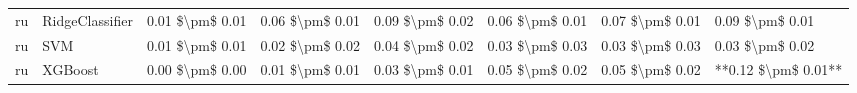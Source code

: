 \begin{tabular}{llllllll}
      ru &                 RidgeClassifier & 0.01 \$\textbackslash pm\$ 0.01 &           0.06 \$\textbackslash pm\$ 0.01 &       0.09 \$\textbackslash pm\$ 0.02 &        0.06 \$\textbackslash pm\$ 0.01 &                         0.07 \$\textbackslash pm\$ 0.01 &     0.09 \$\textbackslash pm\$ 0.01 \\
      ru &                             SVM & 0.01 \$\textbackslash pm\$ 0.01 &           0.02 \$\textbackslash pm\$ 0.02 &       0.04 \$\textbackslash pm\$ 0.02 &        0.03 \$\textbackslash pm\$ 0.03 &                         0.03 \$\textbackslash pm\$ 0.03 &     0.03 \$\textbackslash pm\$ 0.02 \\
      ru &                         XGBoost & 0.00 \$\textbackslash pm\$ 0.00 &           0.01 \$\textbackslash pm\$ 0.01 &       0.03 \$\textbackslash pm\$ 0.01 &        0.05 \$\textbackslash pm\$ 0.02 &                         0.05 \$\textbackslash pm\$ 0.02 & **0.12 \$\textbackslash pm\$ 0.01** \\
\bottomrule
\end{tabular}
